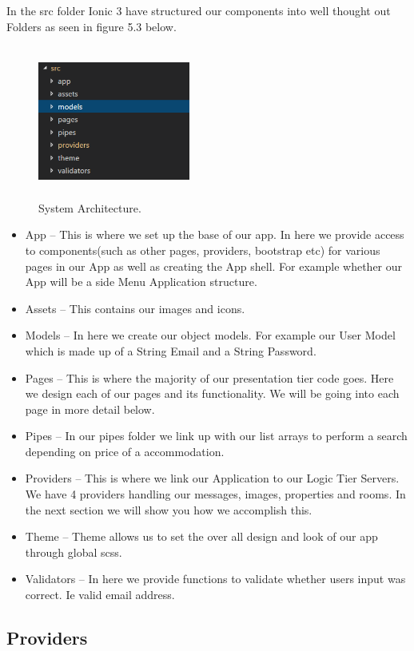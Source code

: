 In the src folder Ionic 3 have structured our components into well thought out Folders as seen in figure 5.3 below.

\begin{figure}[h]
\centering
\includegraphics[width=5cm, height=5cm]{img/srcStructure}
\caption{System Architecture.}
\end{figure}

\begin{itemize}
\item App – This is where we set up the base of our app. In here we provide access to components(such as other pages, providers, bootstrap etc) for various pages in our App as well as creating the App shell. For example whether our App will be a side Menu Application structure.
\item Assets – This contains our images and icons. 
\item Models – In here we create our object models. For example our User Model which is made up of a String Email and a String Password.
\item Pages – This is where the majority of our presentation tier code goes. Here we design each of our pages and its functionality. We will be going into each page in more detail below.
\item Pipes – In our pipes folder we link up with our list arrays to perform a search depending on price of a accommodation.
\item Providers – This is where we link our Application to our Logic Tier Servers. We have 4 providers handling our messages, images, properties and rooms. In the next section we will show you how we accomplish this.
\item Theme – Theme allows us to set the over all design and look of our app through global scss.
\item Validators – In here we provide functions to validate whether users input was correct. Ie valid email address.
\end{itemize}

\subsection{Providers}

